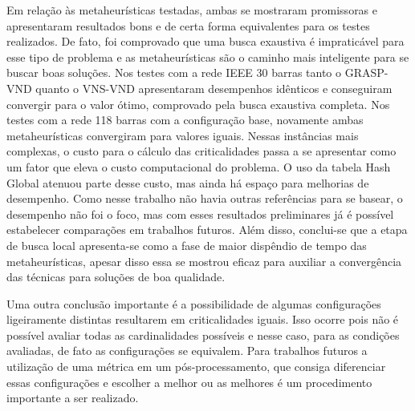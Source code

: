 \documentclass[12pt]{article}
\begin{document}
Em relação às metaheurísticas testadas, ambas se mostraram promissoras e apresentaram resultados bons e de certa forma equivalentes para os testes realizados. De fato, foi comprovado que uma busca exaustiva é impraticável para esse tipo de problema e as metaheurísticas são o caminho mais inteligente para se buscar boas soluções. Nos testes com a rede IEEE 30 barras tanto o GRASP-VND quanto o VNS-VND apresentaram desempenhos idênticos e conseguiram convergir para o valor ótimo, comprovado pela busca exaustiva completa. Nos testes com a rede 118 barras com a configuração base, novamente ambas metaheurísticas convergiram para valores iguais. Nessas instâncias mais complexas, o custo para o cálculo das criticalidades passa a se apresentar como um fator que eleva o custo computacional do problema. O uso da tabela Hash Global atenuou parte desse custo, mas ainda há espaço para melhorias de desempenho. Como nesse trabalho não havia outras referências para se basear, o desempenho não foi o foco, mas com esses resultados preliminares já é possível estabelecer comparações em trabalhos futuros. Além disso, conclui-se que a etapa de busca local apresenta-se como a fase de maior dispêndio de tempo das metaheurísticas, apesar disso essa se mostrou eficaz para auxiliar a convergência das técnicas para soluções de boa qualidade. 

Uma outra conclusão importante é a possibilidade de algumas configurações ligeiramente distintas resultarem em criticalidades iguais. Isso ocorre pois não é possível avaliar todas as cardinalidades possíveis e nesse caso, para as condições avaliadas, de fato as configurações se equivalem. Para trabalhos futuros a utilização de uma métrica em um pós-processamento, que consiga diferenciar essas configurações e escolher a melhor ou as melhores é um procedimento importante a ser realizado.
\end{document}
